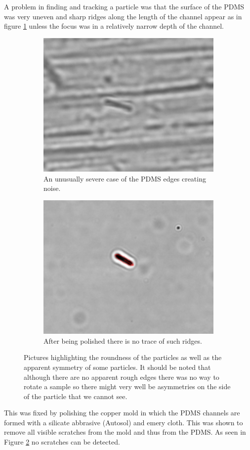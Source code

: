 A problem in finding and tracking a particle was that the surface of the PDMS was very uneven and sharp ridges along the length of the channel appear as in figure \ref{fig:unpolished} unless the focus was in a relatively narrow depth of the channel. 
 
 \begin{figure}[H]
 \centering
 \begin{subfigure}[3a]{0.40\textwidth}
 \includegraphics[width=\textwidth]{figures/improvements/unpolished.png}
 \caption{An unusually severe case of the PDMS edges creating noise.}\label{fig:unpolished}
 \end{subfigure}\hspace{1em}%
 \begin{subfigure}[3b]{0.40\textwidth}
 \includegraphics[width=\textwidth]{figures/improvements/polished.png}
 \caption{After being polished there is no trace of such ridges.}\label{fig:polished}
 \end{subfigure}
 \caption{Pictures highlighting the roundness of the particles as well as the apparent symmetry of some particles. It should be noted that although there are no apparent rough edges there was no way to rotate a sample so there might very well be asymmetries on the side of the particle that we cannot see.}
 \label{fig:polisheffect}
 \end{figure}
 

This was fixed by polishing the copper mold in which the PDMS channels are formed with a silicate abbrasive (Autosol) and emery cloth. This was shown to remove all visible scratches from the mold and thus from the PDMS. As seen in Figure \ref{fig:polished} no scratches can be detected.